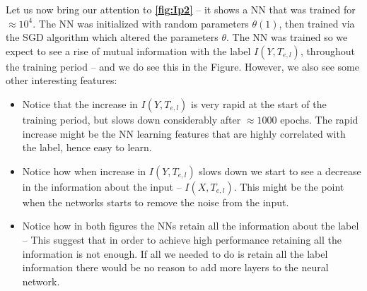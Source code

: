 \documentclass[dissertation.tex]{subfiles}
\begin{document}
Let us now bring our attention to \textbf{\autoref{fig:Ip2}} -- it shows a NN
that was trained for $\approx{10^4}$. The NN was initialized with random
parameters $\theta(1)$, then trained via the SGD algorithm which altered the
parameters $\theta$. The NN was trained so we expect to see a rise of mutual
information with the label $I(Y, T_{e, l})$, throughout the training period --
and we do see this in the Figure. However, we also see some other interesting
features:
\begin{itemize}
  \item{
      Notice that the increase in $I(Y,T_{e,l})$ is very rapid at the start of
      the training period, but slows down considerably after $\approx 1000$
      epochs. The rapid increase might be the NN learning features that are
      highly correlated with the label, hence easy to learn.
    }
  \item{
      Notice how when increase in $I(Y,T_{e,l})$ slows down we start to see a
      decrease in the information about the input -- $I(X,T_{e,l})$. This might
      be the point when the networks starts to remove the noise from the input.
    }
  \item{
      Notice how in both figures the NNs retain all the information about the
      label -- This suggest that in order to achieve high performance retaining
      all the information is not enough. If all we needed to do is retain all
      the label information there would be no reason to add more layers to the
      neural network.
    }
\end{itemize}
\end{document}
